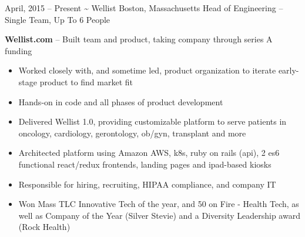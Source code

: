 \documentclass[]{friggeri-cv}
\begin{document}
\begin{entrylist}
  \entryalt
    {April, 2015 -- Present}
    {\textbf{\textasciitilde} Wellist}
    {Boston, Massachusetts}
    {Head of Engineering -- Single Team, Up To 6 People}
    {\textbf{Wellist.com} -- Built team and product, taking company through series A funding
    \begin{itemize}
      \item Worked closely with, and sometime led, product organization to iterate early-stage product to find market fit
      \item Hands-on in code and all phases of product development
      \item Delivered Wellist 1.0, providing customizable platform to serve patients in oncology, cardiology, gerontology, ob/gyn, transplant and more
      \item Architected platform using Amazon AWS, k8s, ruby on rails (api), 2 es6 functional react/redux frontends, landing pages and ipad-based kiosks
      \item Responsible for hiring, recruiting, HIPAA compliance, and company IT
      \item Won Mass TLC Innovative Tech of the year, and 50 on Fire - Health Tech, as well as Company of the Year (Silver Stevie) and a Diversity Leadership award (Rock Health)
    \end{itemize}}


\end{entrylist}
\end{document}
